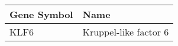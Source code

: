 \begin{tabular}{ll}
\toprule
Gene Symbol &                  Name \\
\midrule
       KLF6 & Kruppel-like factor 6 \\
\bottomrule
\end{tabular}
